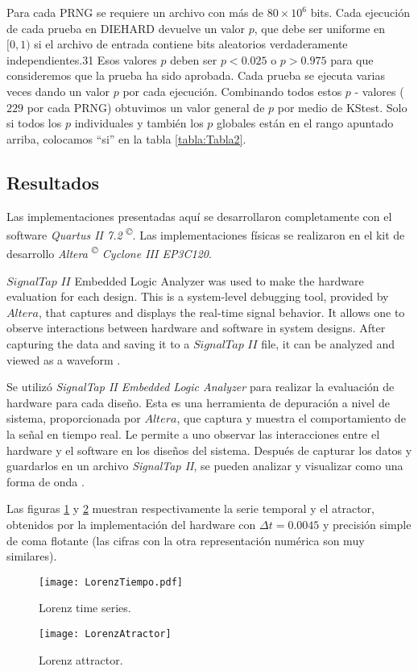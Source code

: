 Para cada PRNG se requiere un archivo con más de $80 \times 10^6$ bits.
Cada ejecución de cada prueba en DIEHARD devuelve un valor $p$, que debe ser uniforme en $[0,1)$ si el archivo de entrada contiene bits aleatorios verdaderamente independientes.31
Esos valores $p$ deben ser $p < 0.025$ o $p > 0.975$ para que consideremos que la prueba ha sido aprobada.
Cada prueba se ejecuta varias veces dando un valor $p$ por cada ejecución.
Combinando todos estos $p$ - valores ($229$ por cada PRNG) obtuvimos un valor general de $p$ por medio de KStest.
Solo si todos los $p$ individuales y también los $p$ globales están en el rango apuntado arriba, colocamos ``si'' en la tabla \ref{tabla:Tabla2}.

\subsection{Resultados}
\label{sec:resultados}

Las implementaciones presentadas aquí se desarrollaron completamente con el software \textit{Quartus II  7.2 \textsuperscript{\copyright}}.
Las implementaciones físicas se realizaron en el kit de desarrollo \textit{Altera \textsuperscript{\copyright} Cyclone III EP3C120}.

$SignalTap$ $II$ Embedded Logic Analyzer was used to make the hardware evaluation for each design.
This is a system-level debugging tool, provided by $Altera$,  that captures and displays the real-time signal behavior.
It allows  one to observe interactions between hardware and software in system designs.
After capturing the data and saving it to a $SignalTap$ $II$ file, it can be analyzed and viewed as a waveform \cite{QUARTUS}.

Se utilizó  \textit{SignalTap II Embedded Logic Analyzer} para realizar la evaluación de hardware para cada diseño.
Esta es una herramienta de depuración a nivel de sistema, proporcionada por $Altera$, que captura y muestra el comportamiento de la señal en tiempo real.
Le permite a uno observar las interacciones entre el hardware y el software en los diseños del sistema.
Después de capturar los datos y guardarlos en un archivo \textit{SignalTap II}, se pueden analizar y visualizar como una forma de onda \cite{CUARTO}.

Las figuras \ref{fig:tiempo} y \ref{fig:atractor} muestran respectivamente la serie temporal y el atractor, obtenidos por la implementación del hardware con $\Delta t = 0.0045$ y precisión simple de coma flotante (las cifras con la otra representación numérica son muy similares).
%
\begin{figure}
	\centering
	\texttt{[image: LorenzTiempo.pdf]}\\
	\caption{Lorenz time series.}\label{fig:tiempo}
\end{figure}
%
\begin{figure}
	\centering
	\texttt{[image: LorenzAtractor]}\\
	\caption{Lorenz attractor.}\label{fig:atractor}
\end{figure}

